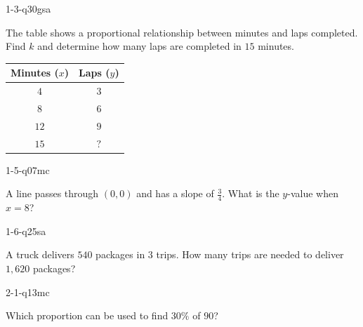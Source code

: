 
\begin{practiceQuestion}{1-3-q30}{gsa}
\begin{questionText}
The table shows a proportional relationship between minutes and laps completed. Find $k$ and determine how many laps are completed in $15$ minutes.

\begin{center}
\begin{tabular}{|c|c|}
\hline
\textbf{Minutes ($x$)} & \textbf{Laps ($y$)} \\ \hline
$4$ & $3$ \\ \hline
$8$ & $6$ \\ \hline
$12$ & $9$ \\ \hline
$15$ & $?$ \\ \hline
\end{tabular}
\end{center}
\end{questionText}
\end{practiceQuestion}

\begin{practiceQuestion}{1-5-q07}{mc}
\begin{questionText}
A line passes through $(0, 0)$ and has a slope of $\frac{3}{4}$. What is the $y$-value when $x = 8$?
\end{questionText}
\end{practiceQuestion}

\begin{practiceQuestion}{1-6-q25}{sa}
\begin{questionText}
A truck delivers $540$ packages in $3$ trips. How many trips are needed to deliver $1{,}620$ packages?
\end{questionText}
\end{practiceQuestion}

\begin{practiceQuestion}{2-1-q13}{mc}
\begin{questionText}
Which proportion can be used to find $30\%$ of $90$?
\end{questionText}
\end{practiceQuestion}

